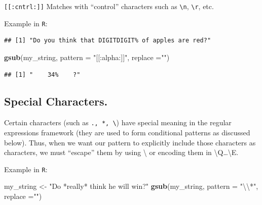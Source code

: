 \documentclass[]{book}
\newenvironment{Shaded}{\begin{snugshade}}{\end{snugshade}}
\newcommand{\CharTok}[1]{\textcolor[rgb]{0.31,0.60,0.02}{#1}}
\newcommand{\DataTypeTok}[1]{\textcolor[rgb]{0.13,0.29,0.53}{#1}}
\newcommand{\KeywordTok}[1]{\textcolor[rgb]{0.13,0.29,0.53}{\textbf{#1}}}
\newcommand{\NormalTok}[1]{#1}
\newcommand{\StringTok}[1]{\textcolor[rgb]{0.31,0.60,0.02}{#1}}
\theoremstyle{definition}
\theoremstyle{definition}
\theoremstyle{definition}
\theoremstyle{remark}
\begin{document}
\texttt{{[}{[}:cntrl:{]}{]}} Matches with ``control'' characters such as \texttt{\textbackslash{}n}, \texttt{\textbackslash{}r}, etc.

Example in \texttt{R}:

\begin{Shaded}
\end{Shaded}

\begin{verbatim}
## [1] "Do you think that DIGITDIGIT% of apples are red?"
\end{verbatim}

\begin{Shaded}
\begin{Highlighting}[]
\KeywordTok{gsub}\NormalTok{(my_string, }\DataTypeTok{pattern =} \StringTok{"[[:alpha:]]"}\NormalTok{, }\DataTypeTok{replace =}\StringTok{""}\NormalTok{)}
\end{Highlighting}
\end{Shaded}

\begin{verbatim}
## [1] "    34%    ?"
\end{verbatim}

\hypertarget{special-characters.}{%
\subsection{Special Characters.}\label{special-characters.}}

Certain characters (such as \texttt{.,\ *,\ \textbackslash{}}) have special meaning in the regular expressions framework (they are used to form conditional patterns as discussed below). Thus, when we want our pattern to explicitly include those characters as characters, we must ``escape'' them by using \textbackslash{} or encoding them in \textbackslash{}Q\ldots{}\textbackslash{}E.

Example in \texttt{R}:

\begin{Shaded}
\begin{Highlighting}[]
\NormalTok{my_string <-}\StringTok{ "Do *really* think he will win?"}
\KeywordTok{gsub}\NormalTok{(my_string, }\DataTypeTok{pattern =} \StringTok{"}\CharTok{\textbackslash{}\textbackslash{}}\StringTok{*"}\NormalTok{, }\DataTypeTok{replace =}\StringTok{""}\NormalTok{)}
\end{Highlighting}
\end{Shaded}
\end{document}
